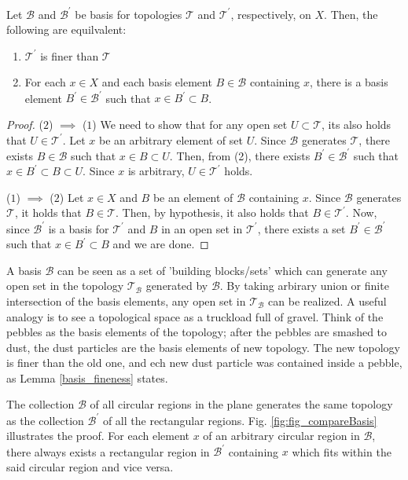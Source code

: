 \documentclass[a4paper,english,12pt]{article}
\newcommand{\B}{\mathcal{B}}
\newcommand{\T}{\mathcal{T}}
\begin{document}
\begin{lem} \label{basis_fineness}
 Let $\B$ and $\B^{'}$ be basis for topologies $\T$ and $\T^{'}$, respectively, on $X$. Then, the following are equilvalent:
 \begin{enumerate}
  \item $\T^{'}$ is finer than $\T$
  \item For each $x \in X$  and each basis element $B \in \B$ containing $x$, there is a basis element $B^{'} \in \B^{'}$ such that $x \in B^{'} \subset B$.
 \end{enumerate}
\end{lem}
\begin{proof}
 ($2$) $\implies$ ($1$) We need to show that for any open set $U \subset \T$, its also holds that $U \in \T^{'}$. Let $x$ be an arbitrary element of set $U$. Since 
 $\B$ generates $\T$, there exists $B \in \B$ such that $x \in B \subset U$. Then, from (2), there exists $B^{'} \in \B^{'}$ such that $x \in B^{'} \subset B \subset U$.
 Since $x$ is arbitrary, $U \in \T^{'}$ holds. 
 
 ($1$) $\implies$ ($2$) Let $x \in X$ and $B$ be an element of $\B$ containing $x$. Since $\B$ generates $\T$, it holds that $B \in \T$. Then, by hypothesis, it also 
 holds that $B \in \T^{'}$. Now, since $\B^{'}$ is a basis for $\T^{'}$ and $B$ in an open set in $\T^{'}$, there exists a set $B^{'} \in \B^{'}$ such that 
 $x \in B^{'} \subset B$ and we are done.
\end{proof}

A basis $\B$ can be seen as a set of 'building blocks/sets' which can generate any open set in the topology $\T_{\B}$ generated by $\B$. By taking 
arbirary union or finite intersection of the basis elements, any open set in $\T_{\B}$ can be realized. A useful analogy is to see a topological space 
as a truckload full of gravel. Think of the pebbles as the basis elements of the topology; after the pebbles are smashed to dust, the dust particles are the
basis elements of new topology. The new topology is finer than the old one, and ech new dust particle was contained inside a pebble, as Lemma \ref{basis_fineness}
states.

\begin{exmp}
The collection $\B$ of all circular regions in the plane generates the same topology as the collection $\B^{'}$ of all the rectangular regions. Fig. \ref{fig:fig_compareBasis} illustrates the proof. For each element $x$ of an arbitrary circular region in $\B$, there always exists a rectangular region in $\B^{'}$ containing $x$ which fits within the said circular region and vice versa. 
\end{exmp}
\end{document}

